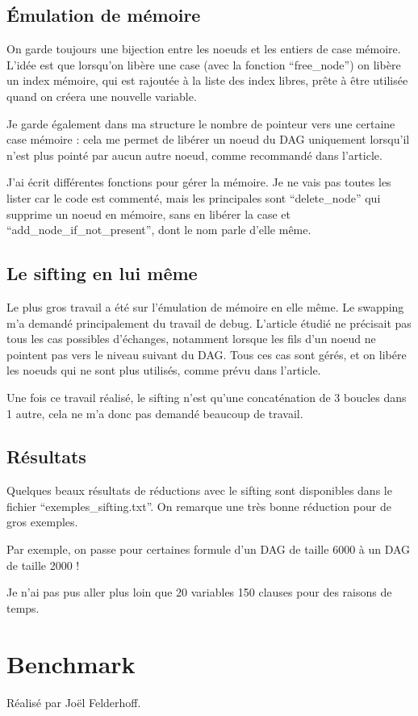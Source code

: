 \documentclass[a4paper,10pt]{article}
\begin{document}
\subsection{Émulation de mémoire}
On garde toujours une bijection entre les noeuds et les entiers de case mémoire. L'idée est que lorsqu'on libère une case (avec la fonction ``free\_node'') on libère un index mémoire, 
qui est rajoutée à la liste des index libres, prête à être utilisée quand on créera une nouvelle variable.

Je garde également dans ma structure le nombre de pointeur vers une certaine case mémoire : cela me permet de libérer un noeud du DAG uniquement lorsqu'il n'est plus pointé par aucun autre
noeud, comme recommandé dans l'article.

J'ai écrit différentes fonctions pour gérer la mémoire. Je ne vais pas toutes les lister car le code est commenté, mais les principales sont ``delete\_node'' qui supprime un noeud en mémoire, sans en libérer la
case et ``add\_node\_if\_not\_present'', dont le nom parle d'elle même.

\subsection{Le sifting en lui même}
Le plus gros travail a été sur l'émulation de mémoire en elle même. Le swapping m'a demandé principalement du travail de debug. L'article étudié ne précisait pas tous les cas possibles d'échanges, 
notamment lorsque les fils d'un noeud ne pointent pas vers le niveau suivant du DAG. Tous ces cas sont gérés, et on libére les noeuds qui ne sont plus utilisés, comme prévu dans l'article.

Une fois ce travail réalisé, le sifting n'est qu'une concaténation de 3 boucles dans 1 autre, cela ne m'a donc pas demandé beaucoup de travail.

\subsection{Résultats}
Quelques beaux résultats de réductions avec le sifting sont disponibles dans le fichier ``exemples\_sifting.txt''. On remarque une très bonne réduction pour de gros exemples.

Par exemple, on passe pour certaines formule d'un DAG de taille 6000 à un DAG de taille 2000 !

Je n'ai pas pus aller plus loin que 20 variables 150 clauses pour des raisons de temps.

\section{Benchmark}
Réalisé par Joël Felderhoff.
\end{document}
